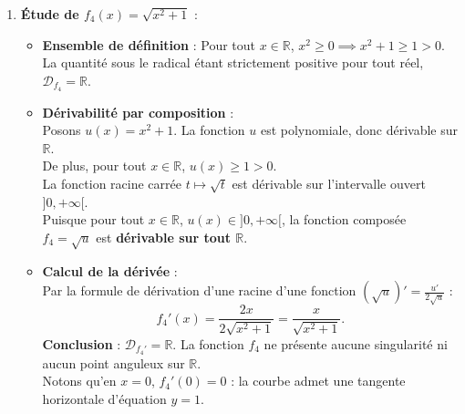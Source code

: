 \documentclass[11pt,a4paper]{article}
\newcommand{\R}{\mathbb{R}}
\begin{document}
\begin{correctionbox}
\begin{enumerate}[label=\textbf{\arabic*.}]
\begin{itemize}
\[        \]
        \begin{itemize}
            \item Pour $h > 0$ petit ($h \in ]0, 1[$), $h - 1 < 0$ donc $h(h-1) < 0$.\\
            Alors $f_3(-1+h) = -h(h-1) = h - h^2$.\\
            Le taux d'accroissement à droite est :
            \[
            \tau_{-1}(h) = \frac{h - h^2}{h} = 1 - h \xrightarrow[h \to 0^+]{} 1 = (f_3)'_d(-1).
            \]
            \item Pour $h < 0$ petit, $h < 0$ et $h - 1 < 0$ donc $h(h-1) > 0$.\\
            Alors $f_3(-1+h) = h(h-1) = h^2 - h$.\\
            Le taux d'accroissement à gauche est :
            \[
            \tau_{-1}(h) = \frac{h^2 - h}{h} = h - 1 \xrightarrow[h \to 0^-]{} -1 = (f_3)'_g(-1).
            \]
        \end{itemize}
        Puisque $(f_3)'_d(-1) = 1 \neq -1 = (f_3)'_g(-1)$, $f_3$ n'est pas dérivable en $-1$.\\
        \textbf{Conclusion} : L'ensemble de dérivabilité est $\mathcal{D}_{f_3'} = \R \setminus \{-1, 0\}$. La courbe admet deux points anguleux en $(-1, 0)$ et $(0, 0)$.
    \end{itemize}

    \item \textbf{Étude de $f_4(x) = \sqrt{x^2+1}$} :
    \begin{itemize}
        \item \textbf{Ensemble de définition} : Pour tout $x \in \R$, $x^2 \ge 0 \implies x^2 + 1 \ge 1 > 0$. La quantité sous le radical étant strictement positive pour tout réel, $\mathcal{D}_{f_4} = \R$.
        \item \textbf{Dérivabilité par composition} :\\
        Posons $u(x) = x^2 + 1$. La fonction $u$ est polynomiale, donc dérivable sur $\R$.\\
        De plus, pour tout $x \in \R$, $u(x) \ge 1 > 0$.\\
        La fonction racine carrée $t \mapsto \sqrt{t}$ est dérivable sur l'intervalle ouvert $]0, +\infty[$.\\
        Puisque pour tout $x \in \R$, $u(x) \in ]0, +\infty[$, la fonction composée $f_4 = \sqrt{u}$ est \textbf{dérivable sur tout $\R$}.
        \item \textbf{Calcul de la dérivée} :\\
        Par la formule de dérivation d'une racine d'une fonction $(\sqrt{u})' = \frac{u'}{2\sqrt{u}}$ :
        \[
        f_4'(x) = \frac{2x}{2\sqrt{x^2+1}} = \frac{x}{\sqrt{x^2+1}}.
        \]
        \textbf{Conclusion} : $\mathcal{D}_{f_4'} = \R$. La fonction $f_4$ ne présente aucune singularité ni aucun point anguleux sur $\R$.\\
        Notons qu'en $x = 0$, $f_4'(0) = 0$ : la courbe admet une tangente horizontale d'équation $y = 1$.
    \end{itemize}


\end{enumerate}
\end{correctionbox}
\end{document}
